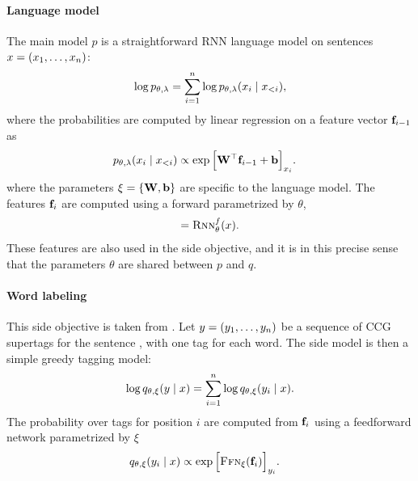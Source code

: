 \paragraph{Language model}
The main model $p$ is a straightforward RNN language model on sentences $x = (x_1, \dots, x_n)$:
\begin{align*}
  \log p_{\theta, \lambda} = \sum_{i=1}^n \log p_{\theta, \lambda}(x_i \mid x_{<i}),
\end{align*}
where the probabilities are computed by linear regression on a feature vector $\mathbf{f}_{i-1}$ as
\begin{align*}
  p_{\theta, \lambda}( x_i \mid x_{<i}) &\propto \exp \Big[ \mathbf{W}^{\top} \mathbf{f}_{i-1} + \mathbf{b} \Big]_{x_i}.
\end{align*}
where the parameters $\xi = \{ \mathbf{W}, \mathbf{b} \}$ are specific to the language model. The features $\mathbf{f}_i$ are computed using a forward \rnn parametrized by $\theta$,
\begin{align*}
  [ \fw_1, \dots, \fw_n ] = \rnn_{\theta}^f( \x ).
\end{align*}
These features are also used in the side objective, and it is in this precise sense that the parameters $\theta$ are shared between $p$ and $q$.

\paragraph{Word labeling}
This side objective is taken from \citep{enguehard2017multitask}. Let $y = ( y_1, \dots, y_n )$ be a sequence of CCG supertags for the sentence \x, with one tag for each word. The side model is then a simple greedy tagging model:
\begin{align*}
  \log q_{\theta, \xi}(y \mid x)
    &= \sum_{i=1}^n \log q_{\theta, \xi}( y_i \mid x).  \\
\end{align*}
The probability over tags for position $i$ are computed from $\mathbf{f}_i$ using a feedforward network parametrized by $\xi$
\begin{align*}
  q_{\theta, \xi}( y_i \mid x) &\propto \exp \Big[ \textsc{Ffn}_{\xi}( \mathbf{f}_{i} ) \Big]_{y_i}.
\end{align*}

